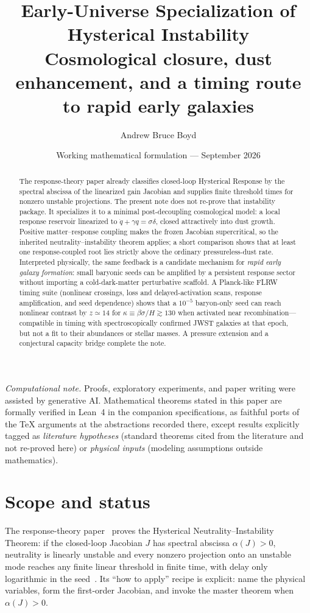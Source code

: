 \documentclass[11pt]{article}
\title{\textbf{Early-Universe Specialization of Hysterical Instability}\\[0.35em]
\large Cosmological closure, dust enhancement, and a timing route to rapid early galaxies}
\author{Andrew Bruce Boyd}
\date{Working mathematical formulation --- September 2026}
\theoremstyle{definition}
\theoremstyle{remark}
\begin{document}
\maketitle
\noindent\textit{Computational note.}
Proofs, exploratory experiments, and paper writing were assisted by generative AI.
Mathematical theorems stated in this paper are formally verified in Lean~4 in the
companion specifications, as faithful ports of the TeX arguments at the abstractions
recorded there, except results explicitly tagged as \emph{literature hypotheses}
(standard theorems cited from the literature and not re-proved here) or
\emph{physical inputs} (modeling assumptions outside mathematics).

\begin{abstract}
The response-theory paper already classifies closed-loop Hysterical Response by the spectral abscissa of the linearized gain Jacobian and supplies finite threshold times for nonzero unstable projections.
The present note does not re-prove that instability package.
It specializes it to a minimal post-decoupling cosmological model: a local response reservoir linearized to $\dot q+\gamma q=\sigma\delta$, closed attractively into dust growth.
Positive matter--response coupling makes the frozen Jacobian supercritical, so the inherited neutrality--instability theorem applies; a short comparison shows that at least one response-coupled root lies strictly above the ordinary pressureless-dust rate.
Interpreted physically, the same feedback is a candidate mechanism for \emph{rapid early galaxy formation}: small baryonic seeds can be amplified by a persistent response sector without importing a cold-dark-matter perturbative scaffold.
A Planck-like FLRW timing suite (nonlinear crossings, loss and delayed-activation scans, response amplification, and seed dependence) shows that a $10^{-5}$ baryon-only seed can reach nonlinear contrast by $z\simeq14$ for $\kappa\equiv\beta\sigma/H\gtrsim130$ when activated near recombination---compatible in timing with spectroscopically confirmed JWST galaxies at that epoch, but not a fit to their abundances or stellar masses.
A pressure extension and a conjectural capacity bridge complete the note.
\end{abstract}
\tableofcontents
\newpage

\section{Scope and status}
\label{sec:scope}
The response-theory paper~\cite{boyd2026response} proves the Hysterical Neutrality--Instability Theorem: if the closed-loop Jacobian $J$ has spectral abscissa $\alpha(J)>0$, neutrality is linearly unstable and every nonzero projection onto an unstable mode reaches any finite linear threshold in finite time, with delay only logarithmic in the seed~\cite{boyd2026response}.
Its ``how to apply'' recipe is explicit: name the physical variables, form the first-order Jacobian, and invoke the master theorem when $\alpha(J)>0$.
\end{document}
